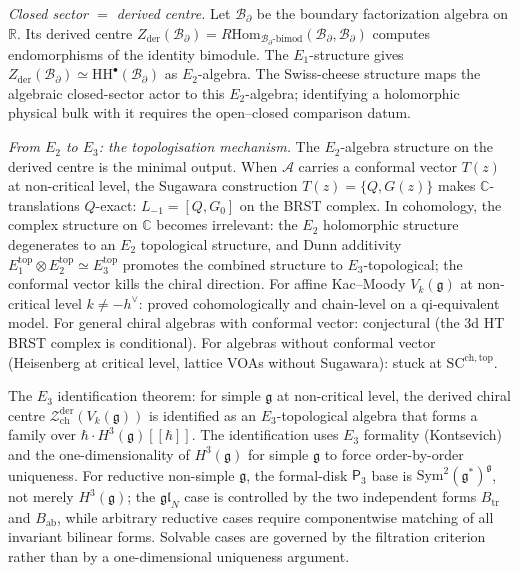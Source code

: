 \documentclass[11pt,reqno]{amsart}
\theoremstyle{definition}
\theoremstyle{remark}
\providecommand{\cA}{\mathcal{A}}
\providecommand{\cB}{\mathcal{B}}
\providecommand{\cZ}{\mathcal{Z}}
\providecommand{\Sym}{\mathrm{Sym}}
\providecommand{\Hom}{\mathrm{Hom}}
\providecommand{\fg}{\mathfrak{g}}
\providecommand{\bC}{\mathbb{C}}
\providecommand{\Pthree}{\mathsf{P}_{3}}
\providecommand{\bR}{\mathbb{R}}
\providecommand{\SCchtop}{\mathrm{SC}^{\mathrm{ch,top}}}
\providecommand{\HH}{\mathrm{HH}}
\providecommand{\der}{\mathrm{der}}
\providecommand{\ch}{\mathrm{ch}}
\numberwithin{equation}{section}
\begin{document}
\medskip\noindent\emph{Closed sector $=$ derived centre.} Let
$\cB_\partial$ be the boundary factorization algebra on $\bR$.
Its derived centre
$Z_{\der}(\cB_\partial) = R\Hom_{\cB_\partial\text{-bimod}}
(\cB_\partial, \cB_\partial)$
computes endomorphisms of the identity bimodule. The
$E_1$-structure gives
$Z_{\der}(\cB_\partial) \simeq \HH^\bullet(\cB_\partial)$ as
$E_2$-algebra. The Swiss-cheese structure maps the algebraic
closed-sector actor to this $E_2$-algebra; identifying a holomorphic
physical bulk with it requires the open--closed comparison datum.

\medskip\noindent\emph{From $E_2$ to $E_3$: the topologisation
mechanism.}\enspace
The $E_2$-algebra structure on the derived centre is the
minimal output. When $\cA$ carries a conformal vector $T(z)$
at non-critical level, the Sugawara construction
$T(z) = \{Q, G(z)\}$ makes $\bC$-translations $Q$-exact:
$L_{-1} = [Q, G_0]$ on the BRST complex. In cohomology, the
complex structure on $\bC$ becomes irrelevant: the $E_2$
holomorphic structure degenerates to an $E_2$ topological
structure, and Dunn additivity
$E_1^{\mathrm{top}} \otimes E_2^{\mathrm{top}}
\simeq E_3^{\mathrm{top}}$ promotes the combined structure
to $E_3$-topological; the conformal vector kills the chiral
direction. For affine Kac--Moody
$V_k(\fg)$ at non-critical level $k \neq -h^\vee$: proved
cohomologically and chain-level on a qi-equivalent model.
For general chiral algebras with conformal vector: conjectural
(the 3d HT BRST complex is conditional). For algebras without
conformal vector (Heisenberg at critical level, lattice VOAs
without Sugawara): stuck at $\SCchtop$.

The $E_3$ identification theorem: for simple $\fg$ at
non-critical level, the derived chiral centre
$\cZ^{\der}_{\ch}(V_k(\fg))$ is identified as an
$E_3$-topological algebra that forms a family over
$\hbar \cdot H^3(\fg)[[\hbar]]$. The identification uses
$E_3$ formality (Kontsevich) and the one-dimensionality of
$H^3(\fg)$ for simple $\fg$ to force order-by-order
uniqueness. For reductive non-simple $\fg$, the formal-disk
$\Pthree$ base is $\Sym^2(\fg^*)^\fg$, not merely
$H^3(\fg)$; the $\mathfrak{gl}_N$ case is controlled by the
two independent forms $B_{\mathrm{tr}}$ and
$B_{\mathrm{ab}}$, while arbitrary reductive cases require
componentwise matching of all invariant bilinear forms.
Solvable cases are governed by the filtration criterion rather
than by a one-dimensional uniqueness argument.
\end{document}
